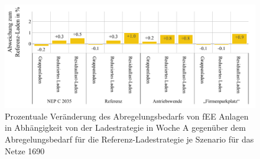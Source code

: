 \begin{figure}[H]
    \centering
    \includegraphics[width=\textwidth]{Bilder/1690_cur_fee_grid_week_A}
    \caption{Prozentuale Veränderung des Abregelungsbedarfs von fEE Anlagen in Abhängigkeit von der Ladestrategie in Woche A gegenüber dem Abregelungsbedarf für die Referenz-Ladestrategie je Szenario für das Netze \num{1690}}\label{fig:1690_cur_fee_grid_week_A}
\end{figure}